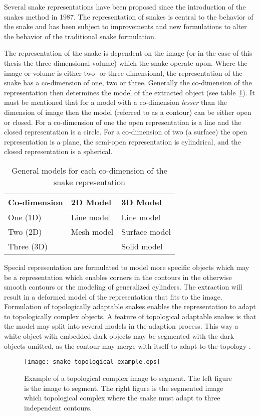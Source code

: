 Several snake representations have been proposed since the
introduction of the snakes method in 1987. The representation of
snakes is central to the behavior of the snake and has been subject to
improvements and new formulations to alter the behavior of the
traditional snake formulation.

The representation of the snake is dependent on the image (or in the
case of this thesis the three-dimensional volume) which the snake
operate upon. Where the image or volume is either two- or
three-dimensional, the representation of the snake has a co-dimension
of one, two or three. Generally the co-dimension of the representation
then determines the model of the extracted object (see
table~\ref{tab:general-models}). It must be mentioned that for a model
with a co-dimension \emph{lesser} than the dimension of image then the
model (referred to as a contour) can be either open or closed. For a
co-dimension of one the open representation is a line and the closed
representation is a circle. For a co-dimension of two (a surface) the
open representation is a plane, the semi-open representation is
cylindrical, and the closed representation is a spherical.
\begin{table}[htbp]
  \centering
  \begin{tabular}[t]{lll}
    \toprule
    \textbf{Co-dimension} & \textbf{2D Model} & \textbf{3D Model}  \\
    \midrule
    One (1D)   &  Line model & Line model    \\
    Two (2D)   &  Mesh model & Surface model \\
    Three (3D) &             & Solid model   \\
    \bottomrule
  \end{tabular}
  \caption{General models for each co-dimension of the snake representation}
  \label{tab:general-models}
\end{table}
Special representation are formulated to model more specific objects
which may be a representation which enables corners in the contours in
the otherwise smooth contours or the modeling of generalized
cylinders.  The extraction will result in a deformed model of the
representation that fits to the image. Formulation of topologically
adaptable snakes enables the representation to adapt to topologically
complex objects. A feature of topological adaptable snakes is that the
model may split into several models in the adaption process. This way
a white object with embedded dark objects may be segmented with the
dark objects omitted, as the contour may merge with itself to adapt to
the topology \citep{mcinerney95,mcinerney97,mcinerney99}.
\begin{figure}[htbp]
  \centering
  \texttt{[image: snake-topological-example.eps]}
  \caption{Example of a topological complex image to segment.
    The left figure is the image to segment. The right figure is the
    segmented image which topological complex where the snake must
    adapt to three independent contours.}
  \label{fig:snake-topological-example}
\end{figure}

